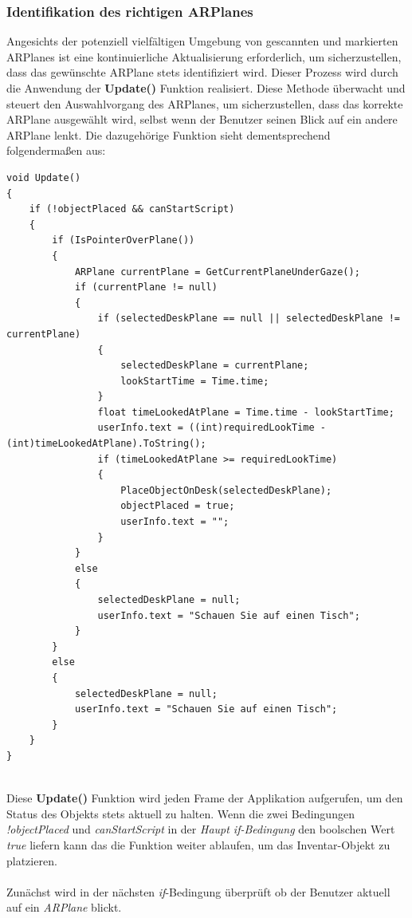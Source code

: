 \subsubsection{Identifikation des richtigen ARPlanes}
Angesichts der potenziell vielfältigen Umgebung von gescannten und markierten ARPlanes ist eine kontinuierliche Aktualisierung
erforderlich, um sicherzustellen, dass das gewünschte ARPlane stets identifiziert wird. Dieser Prozess wird durch die
Anwendung der \textbf{Update()} Funktion realisiert. Diese Methode überwacht und steuert den Auswahlvorgang des ARPlanes,
um sicherzustellen, dass das korrekte ARPlane ausgewählt wird, selbst wenn der Benutzer seinen Blick auf ein andere ARPlane
lenkt. Die dazugehörige Funktion sieht dementsprechend folgendermaßen aus:
\begin{lstlisting}[style=csharp, caption={Update Funktion}, label=code:Update]
void Update()
{
    if (!objectPlaced && canStartScript)
    {
        if (IsPointerOverPlane())
        {
            ARPlane currentPlane = GetCurrentPlaneUnderGaze();
            if (currentPlane != null)
            {
                if (selectedDeskPlane == null || selectedDeskPlane != currentPlane)
                {
                    selectedDeskPlane = currentPlane;
                    lookStartTime = Time.time;
                }
                float timeLookedAtPlane = Time.time - lookStartTime;
                userInfo.text = ((int)requiredLookTime - (int)timeLookedAtPlane).ToString();
                if (timeLookedAtPlane >= requiredLookTime)
                {
                    PlaceObjectOnDesk(selectedDeskPlane);
                    objectPlaced = true;
                    userInfo.text = "";
                }
            }
            else
            {
                selectedDeskPlane = null;
                userInfo.text = "Schauen Sie auf einen Tisch";
            }
        }
        else
        {
            selectedDeskPlane = null;
            userInfo.text = "Schauen Sie auf einen Tisch";
        }
    }
}
\end{lstlisting}
\\
Diese \textbf{Update()} Funktion wird jeden Frame der Applikation aufgerufen, um den Status des Objekts stets aktuell zu
halten. Wenn die zwei Bedingungen \textit{!objectPlaced} und \textit{canStartScript} in der \textit{Haupt if-Bedingung}
den boolschen Wert \textit{true} liefern kann das die Funktion weiter ablaufen, um das Inventar-Objekt zu platzieren.
\\
\\
Zunächst wird in der nächsten \textit{if}-Bedingung überprüft ob der Benutzer aktuell auf ein \textit{ARPlane} blickt.
